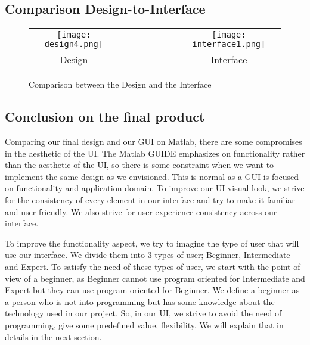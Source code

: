 \subsection{Comparison Design-to-Interface}
\begin{figure}[ht]
	\centering
		\begin{tabular}{c r r r | r r r c}
			\texttt{[image: design4.png]}&&&&&&&\texttt{[image: interface1.png]}\\
			Design&&&&&&&Interface
		\end{tabular}
	\caption{Comparison between the Design and the Interface}
	\label{fig:design-interface }
\end{figure}


\subsection{Conclusion on the final product}
\par \vspace{0.25cm}Comparing our final design and our GUI on Matlab, there are some compromises in the aesthetic of the UI. The Matlab GUIDE emphasizes on functionality rather than the aesthetic of the UI, so there is some constraint when we want to implement the same design as we envisioned. This is normal as a GUI is focused on functionality and application domain. To improve our UI visual look, we strive for the consistency of every element in our interface and try to make it familiar and user-friendly. We also strive for user experience consistency across our interface.
\par \vspace{0.25cm}To improve the functionality aspect, we try to imagine the type of user that will use our interface. We divide them into 3 types of user; Beginner, Intermediate and Expert. To satisfy the need of these types of user, we start with the point of view of a beginner, as Beginner cannot use program oriented for Intermediate and Expert but they can use program oriented for Beginner. We define a beginner as a person who is not into programming but has some knowledge about the technology used in our project. So, in our UI, we strive to avoid the need of programming, give some predefined value, flexibility. We will explain that in details in the next section.  


